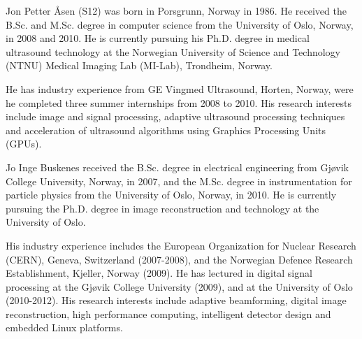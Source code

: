 \documentclass[journal]{IEEEtran}
\begin{document}
\begin{IEEEbiography}{Jon Petter \AA{}sen}
(S12) was born in Porsgrunn, Norway in 1986. He received the B.Sc. and M.Sc. degree in computer science from the University of Oslo, Norway, in 2008 and 2010. He is currently pursuing his Ph.D. degree in medical ultrasound technology at the Norwegian University of Science and Technology (NTNU) Medical Imaging Lab (MI-Lab), Trondheim, Norway. 

He has industry experience from GE Vingmed Ultrasound, Horten, Norway, were he completed three summer internships from 2008 to 2010. His research interests include image and signal processing, adaptive ultrasound processing techniques and acceleration of ultrasound algorithms using Graphics Processing Units (GPUs). 
\end{IEEEbiography}

\begin{IEEEbiography}{Jo Inge Buskenes}
received the B.Sc. degree in electrical engineering from Gj\o{}vik College University, Norway, in 2007, and the M.Sc. degree in instrumentation for particle physics from the University of Oslo, Norway, in 2010. He is currently pursuing the Ph.D. degree in image reconstruction and technology at the University of Oslo.

His industry experience includes the European Organization for Nuclear Research (CERN), Geneva, Switzerland (2007-2008), and the Norwegian Defence Research Establishment, Kjeller, Norway (2009). He has lectured in digital signal processing at the Gj\o{}vik College University (2009), and at the University of Oslo (2010-2012). His research interests include adaptive beamforming, digital image reconstruction, high performance computing, intelligent detector design and embedded Linux platforms.
\end{IEEEbiography}
\end{document}
